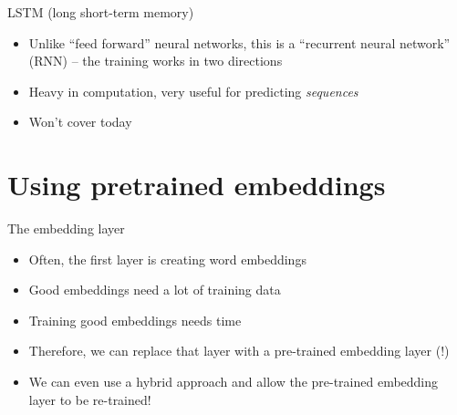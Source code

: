 \documentclass[compress]{beamer}
\begin{document}
\begin{frame}{LSTM (long short-term memory)}
	\begin{itemize}
		\item Unlike ``feed forward'' neural networks, this is  a ``recurrent neural network'' (RNN) -- the training works in two directions
		\item Heavy in computation, very useful for predicting \emph{sequences}
		\item Won't cover today
	\end{itemize}
\end{frame}


\section{Using pretrained embeddings}

\begin{frame}{The embedding layer}
	\begin{itemize}
		\item Often, the first layer is creating word embeddings
		\item Good embeddings need a lot of training data
		\item Training good embeddings needs time
		\item Therefore, we can replace that layer with a pre-trained embedding layer (!)
		\item We can even use a hybrid approach and allow the pre-trained embedding layer to be re-trained!
	\end{itemize}
\end{frame}







\begin{frame}[plain]
	\printbibliography
\end{frame}
\end{document}
